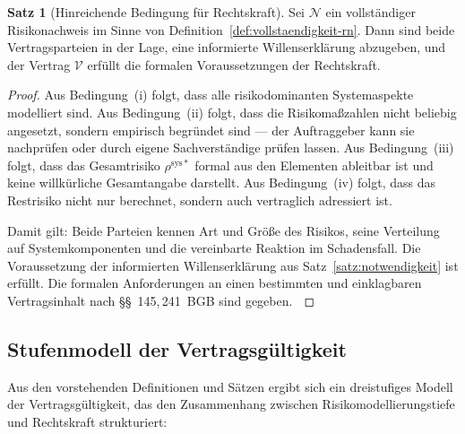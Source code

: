 ﻿\documentclass[a4paper,12pt]{article}
\theoremstyle{definition}
\newtheorem{satz}{Satz}
\newenvironment{beweis}{\begin{proof}}{\end{proof}}
\begin{document}
\begin{satz}[Hinreichende Bedingung f\"ur Rechtskraft]
\label{satz:hinreichend}
    Sei $\mathcal{N}$ ein vollst\"andiger Risikonachweis im Sinne von
    Definition~\ref{def:vollstaendigkeit-rn}. Dann sind beide Vertragsparteien
    in der Lage, eine informierte Willenserkl\"arung abzugeben, und der Vertrag
    $\mathcal{V}$ erf\"ullt die formalen Voraussetzungen der Rechtskraft.
\end{satz}

\begin{beweis}
    Aus Bedingung~(i) folgt, dass alle risikodominanten Systemaspekte modelliert
    sind. Aus Bedingung~(ii) folgt, dass die Risikoma\ss{}zahlen nicht beliebig
    angesetzt, sondern empirisch begr\"undet sind --- der Auftraggeber kann sie
    nachpr\"ufen oder durch eigene Sachverst\"andige pr\"ufen lassen. Aus
    Bedingung~(iii) folgt, dass das Gesamtrisiko $\rho^{\mathrm{sys}*}$ formal
    aus den Elementen ableitbar ist und keine willk\"urliche Gesamtangabe darstellt.
    Aus Bedingung~(iv) folgt, dass das Restrisiko nicht nur berechnet, sondern
    auch vertraglich adressiert ist.

    Damit gilt: Beide Parteien kennen Art und Gr\"o\ss{}e des Risikos, seine
    Verteilung auf Systemkomponenten und die vereinbarte Reaktion im Schadensfall.
    Die Voraussetzung der informierten Willenserkl\"arung aus Satz~\ref{satz:notwendigkeit}
    ist erf\"ullt. Die formalen Anforderungen an einen bestimmten und einklagbaren
    Vertragsinhalt nach \S\S~145,\,241~BGB sind gegeben. $\qedhere$
\end{beweis}

\subsection{Stufenmodell der Vertragsg\"ultigkeit}

Aus den vorstehenden Definitionen und S\"atzen ergibt sich ein dreistufiges
Modell der Vertragsg\"ultigkeit, das den Zusammenhang zwischen
Risikomodellierungstiefe und Rechtskraft strukturiert:
\end{document}

